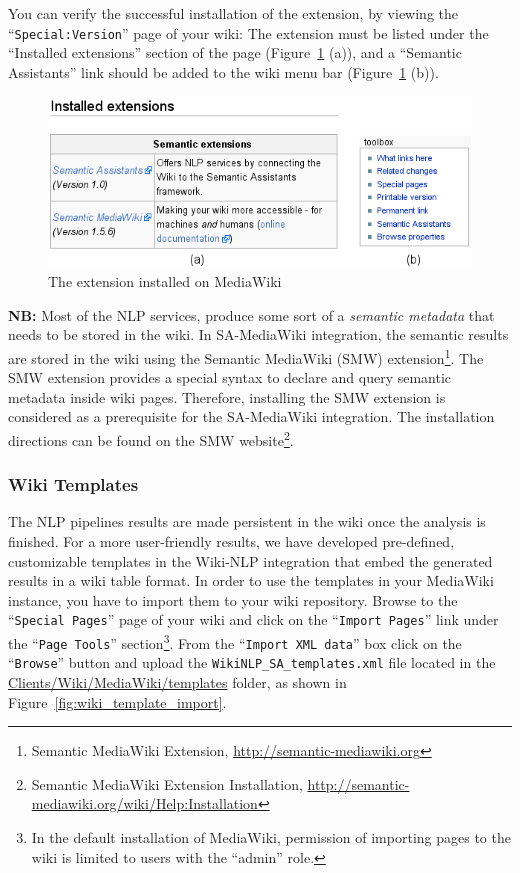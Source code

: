 You can verify the successful installation of the \sa extension, by viewing the ``\texttt{Special:Version}'' page of your wiki: The \sa extension must be listed under the ``Installed extensions'' section of the page (Figure~\ref{fig:semassist_plugin} (a)), and a ``Semantic Assistants'' link should be added to the wiki menu bar (Figure~\ref{fig:semassist_plugin} (b)).

\begin{figure}
\centering
\includegraphics[scale=0.8]{pictures/semassist_plugin.png}
\caption{The \sa extension installed on MediaWiki}
\label{fig:semassist_plugin}
\end{figure}

\blankline
\noindent
\textbf{NB:} Most of the NLP services, produce some sort of a \emph{semantic metadata} that needs to be stored in the wiki. In SA-MediaWiki integration, the semantic results are stored in the wiki using the Semantic MediaWiki (SMW) extension\footnote{Semantic MediaWiki Extension, \url{http://semantic-mediawiki.org}}. The SMW extension provides a special syntax to declare and query semantic metadata inside wiki pages. Therefore, installing the SMW extension is considered as a prerequisite for the SA-MediaWiki integration. The installation directions can be found on the SMW website\footnote{Semantic MediaWiki Extension Installation, \url{http://semantic-mediawiki.org/wiki/Help:Installation}}.

\subsubsection{Wiki Templates}
The NLP pipelines results are made persistent in the wiki once the analysis is finished. For a more user-friendly results, we have developed pre-defined, customizable templates in the Wiki-NLP integration that embed the generated results in a wiki table format. In order to use the templates in your MediaWiki instance, you have to import them to your wiki repository. Browse to the ``\texttt{Special Pages}'' page of your wiki and click on the ``\texttt{Import Pages}'' link under the ``\texttt{Page Tools}'' section\footnote{In the default installation of MediaWiki, permission of importing pages to the wiki is limited to users with the ``admin'' role.}. From the ``\texttt{Import XML data}'' box click on the ``\texttt{Browse}'' button and upload the \texttt{WikiNLP\_SA\_templates.xml} file located in the \url{Clients/Wiki/MediaWiki/templates} folder, as shown in Figure~\ref{fig:wiki_template_import}.

